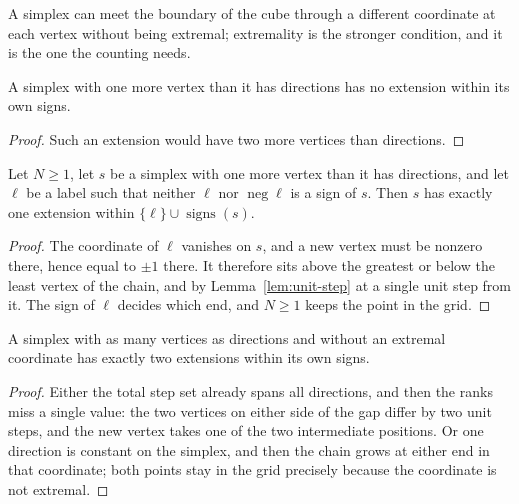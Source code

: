 A simplex can meet the boundary of the cube through a different coordinate at each
vertex without being extremal; extremality is the stronger condition, and it is the
one the counting needs.

\begin{lemma}[No extension]
\label{lem:extensions-empty}
\leanok
{}
A simplex with one more vertex than it has directions has no extension within its own
signs.
\end{lemma}
\begin{proof}
\leanok
{}
Such an extension would have two more vertices than directions.
\end{proof}

\begin{lemma}
\label{lem:extensions-one}
\leanok
{}
Let $N \ge 1$, let $s$ be a simplex with one more vertex than it has directions, and
let $\ell$ be a label such that neither $\ell$ nor $\operatorname{neg} \ell$ is a sign
of $s$. Then $s$ has exactly one extension within $\{\ell\} \cup \operatorname{signs}(s)$.
\end{lemma}
\begin{proof}
\leanok
{}
The coordinate of $\ell$ vanishes on $s$, and a new vertex must be nonzero there, hence
equal to $\pm 1$ there. It therefore sits above the greatest or below the least vertex
of the chain, and by Lemma~\ref{lem:unit-step} at a single unit step from it. The sign
of $\ell$ decides which end, and $N \ge 1$ keeps the point in the grid.
\end{proof}

\begin{lemma}
\label{lem:extensions-two}
\leanok
{}
A simplex with as many vertices as directions and without an extremal coordinate has
exactly two extensions within its own signs.
\end{lemma}
\begin{proof}
\leanok
{}
Either the total step set already spans all directions, and then the ranks miss a
single value: the two vertices on either side of the gap differ by two unit steps, and
the new vertex takes one of the two intermediate positions. Or one direction is
constant on the simplex, and then the chain grows at either end in that coordinate;
both points stay in the grid precisely because the coordinate is not extremal.
\end{proof}

